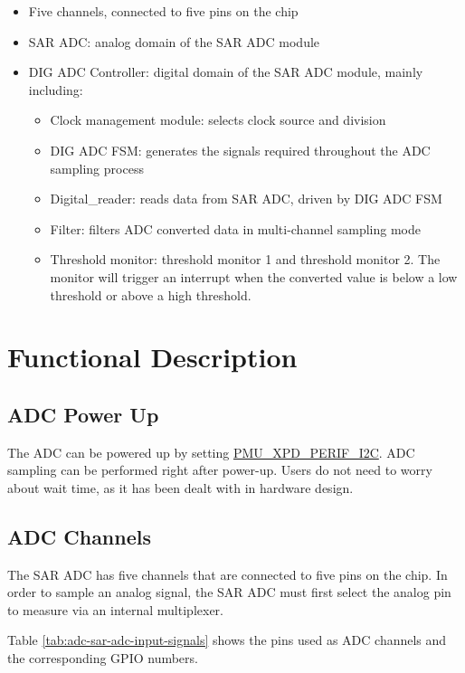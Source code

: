 \documentclass[main\_\_EN.tex]{subfiles}
\begin{document}
\begin{itemize}
    \item Five channels, connected to five pins on the chip
    \item SAR ADC: analog domain of the SAR ADC module
    \item DIG ADC Controller: digital domain of the SAR ADC module, mainly including:
        \begin{itemize}
            \item Clock management module: selects clock source and division
            \item DIG ADC FSM: generates the signals required throughout the ADC sampling process
            \item Digital\_reader: reads data from SAR ADC, driven by DIG ADC FSM
            \item Filter: filters ADC converted data in multi-channel sampling mode
            \item Threshold monitor: threshold monitor 1 and threshold monitor 2. The monitor will trigger an interrupt when the converted value is below a low threshold or above a high threshold.
        \end{itemize}
\end{itemize}

\section{Functional Description}

\subsection{ADC Power Up}

The ADC can be powered up by setting \hyperref[fielddesc:PMUXPDPERIFI2C]{PMU\_XPD\_PERIF\_I2C}. ADC sampling can be performed right after power-up. Users do not need to worry about wait time, as it has been dealt with in hardware design.
\subsection{ADC Channels}

The SAR ADC has five channels that are connected to five pins on the chip. In order to sample an analog signal, the SAR ADC must first select the analog pin to measure via an internal multiplexer.

Table \ref{tab:adc-sar-adc-input-signals} shows the pins used as ADC channels and the corresponding GPIO numbers.
\end{document}
